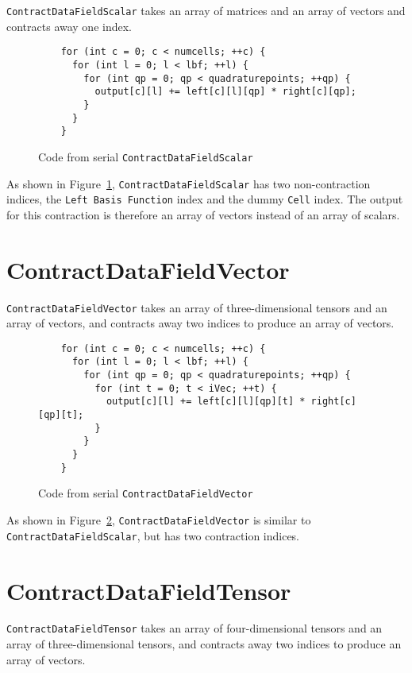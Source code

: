 \texttt{ContractDataFieldScalar} takes an array of matrices and an array of
vectors and contracts away one index.

\begin{figure}[ht]
    \begin{lstlisting}
    for (int c = 0; c < numcells; ++c) {
      for (int l = 0; l < lbf; ++l) {
        for (int qp = 0; qp < quadraturepoints; ++qp) {
          output[c][l] += left[c][l][qp] * right[c][qp];
        }
      }
    }
    \end{lstlisting}
\caption{Code from serial \texttt{ContractDataFieldScalar}
\label{lst:ContractDataFieldScalarSerial}} 
\end{figure}

As shown in Figure~\ref{lst:ContractDataFieldScalarSerial},
\texttt{ContractDataFieldScalar} has two non-contraction indices, the
\texttt{Left Basis Function} index and the dummy \texttt{Cell} index.  The
output for this contraction is therefore an array of vectors instead of an array
of scalars.

\section{ContractDataFieldVector}
\texttt{ContractDataFieldVector} takes an array of three-dimensional tensors and
an array of vectors, and contracts away two indices to produce an array of
vectors.

\begin{figure}[ht]
    \begin{lstlisting}
    for (int c = 0; c < numcells; ++c) {
      for (int l = 0; l < lbf; ++l) {
        for (int qp = 0; qp < quadraturepoints; ++qp) {
          for (int t = 0; t < iVec; ++t) {
            output[c][l] += left[c][l][qp][t] * right[c][qp][t];
          }
        }
      }
    }
    \end{lstlisting}
\caption{Code from serial \texttt{ContractDataFieldVector}
\label{lst:ContractDataFieldVectorSerial}} 
\end{figure}

As shown in Figure~\ref{lst:ContractDataFieldVectorSerial},
\texttt{ContractDataFieldVector} is similar to \texttt{ContractDataFieldScalar},
but has two contraction indices. 

\section{ContractDataFieldTensor}
\texttt{ContractDataFieldTensor} takes an array of four-dimensional tensors and
an array of three-dimensional tensors, and contracts away two indices to produce
an array of vectors.

